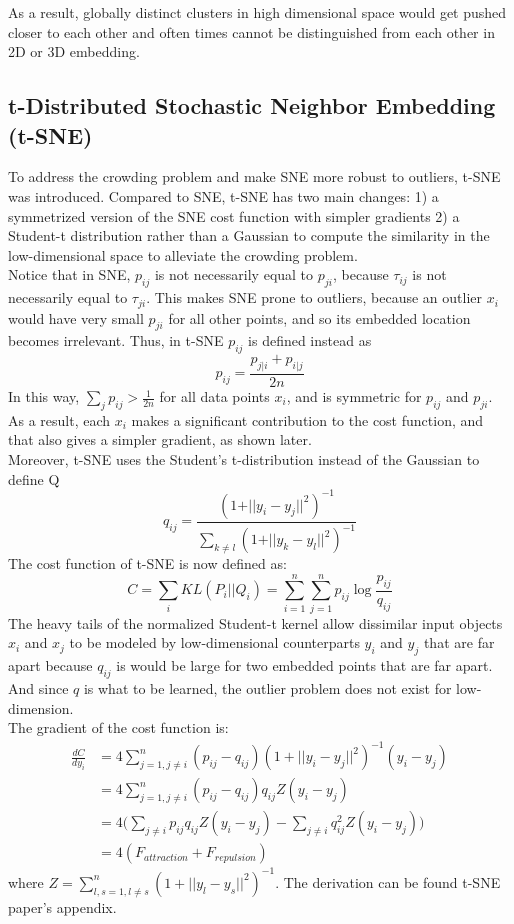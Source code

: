 As a result, globally distinct clusters in high dimensional space
would get pushed closer to each other and often times cannot be
distinguished from each other in 2D or 3D embedding. 

\subsection{t-Distributed Stochastic Neighbor Embedding (t-SNE)}
To address the crowding problem and make SNE more robust to outliers, t-SNE was
introduced. Compared to SNE, t-SNE has two main changes: 1) a symmetrized
version of the SNE cost function with simpler gradients 2) a Student-t
distribution rather than a Gaussian to compute the similarity in the
low-dimensional space to alleviate the crowding problem.\\

\noindent Notice that in SNE, $p_{ij}$ is not necessarily equal to
$p_{ji}$, because $\tau_{ij}$ is not necessarily equal to
$\tau_{ji}$. This makes SNE prone to outliers, because an outlier
$x_i$ would have very small $p_{ji}$ for all other points, and so its
embedded location becomes irrelevant. Thus, in t-SNE $p_{ij}$ is
defined instead as 
\[
p_{ij} = \frac{p_{j \vert i}+p_{i \vert j}}{2n}
\]
In this way, $\sum_j p_{ij} > \frac{1}{2n}$ for all data points
$x_i$, and is symmetric for $p_{ij}$ and $p_{ji}$. As a result, each $x_i$ makes a significant contribution to the cost function, and that also gives a simpler gradient, 
as shown later. \\ 

\noindent Moreover, t-SNE uses the Student's t-distribution instead of
the Gaussian to define Q 
\[
q_{ij}=\frac{(1+\vert \vert y_i - y_j \vert \vert^2)^{-1}}{\sum_{k\neq l}(1+\vert \vert y_k - y_l \vert \vert^2)^{-1}}
\]
The cost function of t-SNE is now defined as:
\[
C=\sum_i KL(P_i \vert \vert Q_i) = \sum_{i=1}^n \sum_{j=1}^n p_{ij} \log \frac{p_{ij}}{q_{ij}}
\]
The heavy tails of the normalized Student-t kernel allow dissimilar
input objects $x_i$ and $x_j$ to be modeled by low-dimensional
counterparts $y_i$ and $y_j$ that are far apart because $q_{ij}$ is
would be large for two embedded points that are far apart. 
And since $q$ is what to be learned, the outlier problem does not
exist for low-dimension. \\ 

\noindent The gradient of the cost function is:
\begin{align*}
\frac{dC}{dy_i}
&=4\sum_{j=1, j\neq i}^{n} (p_{ij}-q_{ij})(1+||y_i-y_j||^2)^{-1}(y_i-y_j)\\
&= 4\sum_{j=1, j\neq i}^{n} (p_{ij}-q_{ij})q_{ij}Z(y_i-y_j)\\
&= 4\Big ( \sum_{j \neq i} p_{ij}q_{ij}Z(y_i-y_j)-\sum_{j\neq i}q_{ij}^2 Z(y_i-y_j) \Big )\\
&= 4(F_{attraction}+F_{repulsion})
\end{align*}
where $Z=\sum_{l,s=1, l\neq s}^{n} (1+||y_l-y_s||^2)^{-1}$. The
derivation can be found t-SNE paper's appendix.\\ 

